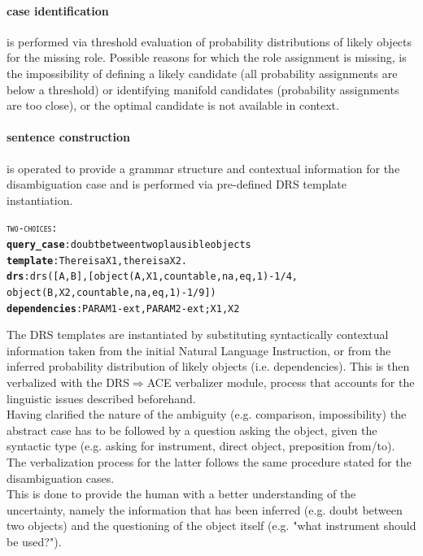 \documentclass[oribibl]{llncs}
\begin{document}
\paragraph{case identification} is performed via threshold evaluation of probability distributions of likely objects for the missing role. 
Possible reasons for which the role assignment is missing, is the impossibility of 
defining a likely candidate (all probability assignments are below a threshold) or identifying manifold candidates (probability assignments are too close), or
the optimal candidate is not available in context.  

\paragraph{sentence construction} is operated to provide a grammar structure and contextual information for the disambiguation case and is performed via pre-defined DRS template instantiation. 
\begin{alltt}

{\large \textsc{two-choices}}:
    \textbf{query_case}: doubt between two plausible objects
    \textbf{template}: There is a X1, there is a X2.
    \textbf{drs}: drs([A,B],[object(A,X1,countable,na,eq,1)-1/4,
    object(B,X2,countable,na,eq,1)-1/9])
    \textbf{dependencies}: PARAM1-ext, PARAM2-ext; X1, X2
\end{alltt}
The DRS templates are instantiated by substituting syntactically contextual information taken from the initial Natural Language Instruction, or from the inferred probability distribution of likely objects (i.e. dependencies).
This is then verbalized with the DRS$\Rightarrow$ACE verbalizer module, process that accounts for the linguistic issues described beforehand.\\
Having clarified the nature of the ambiguity (e.g. comparison, impossibility) the abstract case has to be followed by a question asking the object, given the syntactic type (e.g. asking for instrument, direct object, preposition from/to). The verbalization process for the latter follows the same procedure stated for the disambiguation cases. \\
This is done to provide the human with a better understanding of the uncertainty, namely the information that has been inferred (e.g. doubt between two objects) and the questioning of the object itself (e.g. "what instrument should be used?").  
\end{document}
